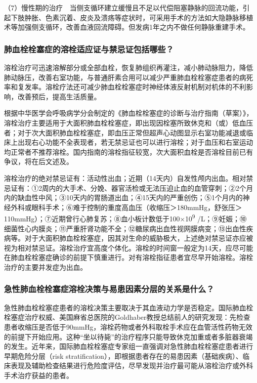 （7）慢性期的治疗　当侧支循环建立缓慢且不足以代偿阻塞静脉的回流功能，引起下肢肿胀、色素沉着、皮炎及溃疡等症状时，可采用手术的方法如大隐静脉移植术等加强侧支循环，改善血液回流障碍。但发病1年之内不做任何静脉重建手术。

\subsubsection{肺血栓栓塞症的溶栓适应证与禁忌证包括哪些？}

溶栓治疗可迅速溶解部分或全部血栓，恢复肺组织再灌注，减小肺动脉阻力，降低肺动脉压，改善右室功能，与普通肝素合用可以减少严重肺血栓栓塞症患者的病死率和复发率。溶栓疗法还可减少肺血栓栓塞症时神经体液反射机制对机体的不利影响，改善预后，提高生活质量。

根据中华医学会呼吸病学分会制定的《肺血栓栓塞症的诊断与治疗指南（草案）》，溶栓治疗主要适用于大面积肺血栓栓塞症，即出现因栓塞所致休克和（或）低血压者；对于次大面积肺血栓栓塞症，即血压正常但超声心动图显示右室功能减退或临床上出现右心功能不全表现者，若无禁忌证也可以进行溶栓；对于血压和右室运动均正常者不推荐溶栓。国内指南的溶栓指征较宽，次大面积血栓是否溶栓目前已有争议，将在后文述及。

溶栓治疗的绝对禁忌证有：活动性出血；近期（14天内）自发性颅内出血。相对禁忌证有：①2周内的大手术、分娩、器官活检或无法压迫止血的血管穿刺；②2个月内的缺血性中风；③10天内的胃肠道出血；④15天内的严重创伤；⑤1个月内的神经外科或眼科手术；⑥难于控制的重度高血压（收缩压＞180mmHg，舒张压＞110mmHg）；⑦近期曾行心肺复苏；⑧血小板计数低于100×10\textsuperscript{9}
/L；⑨妊娠；⑩细菌性心内膜炎；⑪严重肝肾功能不全；⑫糖尿病出血性视网膜病变；⑬出血性疾病等。对于大面积肺血栓栓塞症，因其对生命的威胁极大，上述绝对禁忌证亦应被视为相对禁忌证。溶栓治疗宜高度个体化。溶栓的时间窗一般定为14天，应尽可能在肺血栓栓塞症确诊的前提下慎重进行。对有溶栓指征患者宜尽早开始溶栓。溶栓治疗的主要并发症为出血。

\subsubsection{急性肺血栓栓塞症溶栓决策与易患因素分层的关系是什么？}

急性肺血栓栓塞症患者的溶栓决策主要取决于其血液动力学是否稳定。国际肺血栓栓塞症治疗权威、美国麻省总医院的Goldhaber教授总结前人的研究发现：先检查患者收缩压是否低于90mmHg，溶栓药物或者外科取栓手术应在血管活性药物无效的前提下开始应用。这种“坐以待毙”的治疗程序只能导致休克加重或者多脏器衰竭的发生。近年来，国际肺血栓栓塞症专家组一直强调对急性肺血栓栓塞症患者进行早期危险分层（risk
stratification），即根据患者存在的易患因素（基础疾病）、临床表现及辅助检查结果进行危险度评估，尽早发现并治疗最可能从溶栓治疗或外科手术治疗获益的患者。

